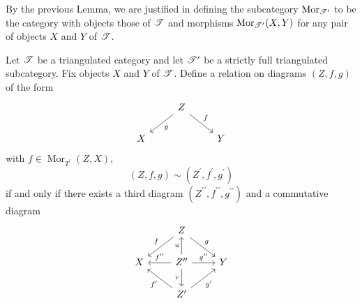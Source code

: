 \documentclass[dissertation.tex]{subfiles}
\begin{document}
\begin{defn}
  By the previous Lemma, we are justified in defining the subcategory $\operatorname{Mor}_{\mathscr{T}^\prime}$ to be the category with objects those of $\mathscr{T}$ and morphisms $\operatorname{Mor}_{\mathscr{T}^\prime}(X,Y)$ for any pair of objects $X$ and $Y$ of $\mathscr{T}$.
\end{defn}

\begin{defn}
  Let $\mathscr{T}$ be a triangulated category and let $\mathscr{T}^\prime$ be a strictly full triangulated subcategory.
  Fix objects $X$ and $Y$ of $\mathscr{T}$.
  Define a relation on diagrams $(Z,f,g)$ of the form 
  $$\begin{tikzcd}
    & Z\arrow{rd}{f}\arrow{ld}{g}\\
    X & & Y
  \end{tikzcd}$$
  with $f \in \operatorname{Mor}_{T^\prime}(Z,X)$,
  $$(Z,f,g) \sim (Z^\prime, f^\prime, g^\prime)$$
  if and only if there exists a third diagram $(Z^{\prime\prime}, f^{\prime\prime}, g^{\prime\prime})$ and a commutative diagram
  $$\begin{tikzcd}
    & Z\arrow[swap]{ld}{f}\arrow{rd}{g}\\
    X & Z^{\prime\prime} \arrow[swap]{l}{f^{\prime\prime}}\arrow{r}{g^{\prime\prime}}\arrow{u}{u}\arrow[swap]{d}{v} & Y\\
    & Z^\prime\arrow{ul}{f^\prime}\arrow[swap]{ur}{g^\prime}
  \end{tikzcd}$$
\end{defn}
\end{document}
